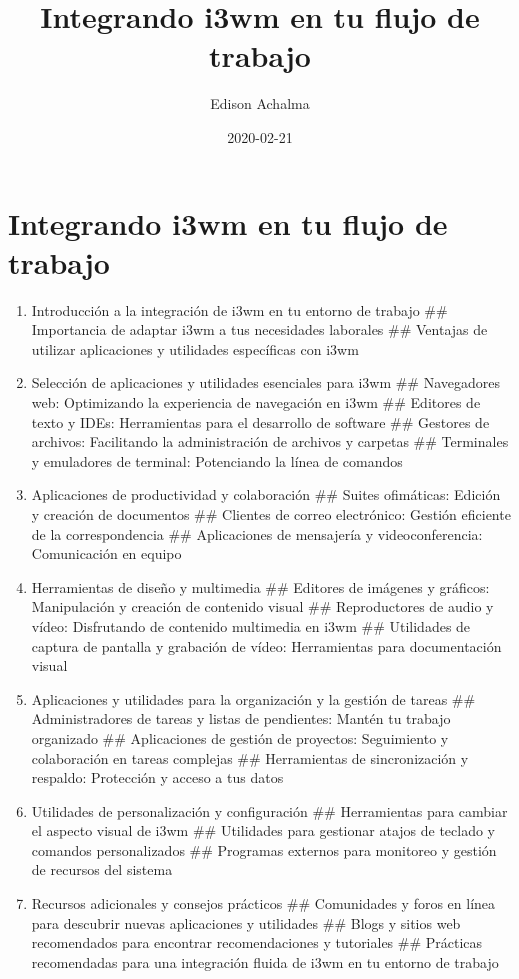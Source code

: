 \documentclass[
  jou,
  floatsintext,
  longtable,
  a4paper,
  nolmodern,
  notxfonts,
  notimes,
  12pt,
  colorlinks=true,linkcolor=blue,citecolor=blue,urlcolor=blue]{apa7}
\title{Integrando i3wm en tu flujo de trabajo}
\author{Edison Achalma}
\affiliation{
{Escuela Profesional de Economía, Universidad Nacional de San Cristóbal
de Huamanga}}
\date{2020-02-21}
\begin{document}
\maketitle


\hypertarget{toc}{}
\tableofcontents
\newpage
\section[Introduction]{Integrando i3wm en tu flujo de trabajo}

\setcounter{secnumdepth}{3}

\setlength\LTleft{0pt}




\begin{enumerate}
\def\labelenumi{\arabic{enumi}.}
\item
  Introducción a la integración de i3wm en tu entorno de trabajo \#\#
  Importancia de adaptar i3wm a tus necesidades laborales \#\# Ventajas
  de utilizar aplicaciones y utilidades específicas con i3wm
\item
  Selección de aplicaciones y utilidades esenciales para i3wm \#\#
  Navegadores web: Optimizando la experiencia de navegación en i3wm \#\#
  Editores de texto y IDEs: Herramientas para el desarrollo de software
  \#\# Gestores de archivos: Facilitando la administración de archivos y
  carpetas \#\# Terminales y emuladores de terminal: Potenciando la
  línea de comandos
\item
  Aplicaciones de productividad y colaboración \#\# Suites ofimáticas:
  Edición y creación de documentos \#\# Clientes de correo electrónico:
  Gestión eficiente de la correspondencia \#\# Aplicaciones de
  mensajería y videoconferencia: Comunicación en equipo
\item
  Herramientas de diseño y multimedia \#\# Editores de imágenes y
  gráficos: Manipulación y creación de contenido visual \#\#
  Reproductores de audio y vídeo: Disfrutando de contenido multimedia en
  i3wm \#\# Utilidades de captura de pantalla y grabación de vídeo:
  Herramientas para documentación visual
\item
  Aplicaciones y utilidades para la organización y la gestión de tareas
  \#\# Administradores de tareas y listas de pendientes: Mantén tu
  trabajo organizado \#\# Aplicaciones de gestión de proyectos:
  Seguimiento y colaboración en tareas complejas \#\# Herramientas de
  sincronización y respaldo: Protección y acceso a tus datos
\item
  Utilidades de personalización y configuración \#\# Herramientas para
  cambiar el aspecto visual de i3wm \#\# Utilidades para gestionar
  atajos de teclado y comandos personalizados \#\# Programas externos
  para monitoreo y gestión de recursos del sistema
\item
  Recursos adicionales y consejos prácticos \#\# Comunidades y foros en
  línea para descubrir nuevas aplicaciones y utilidades \#\# Blogs y
  sitios web recomendados para encontrar recomendaciones y tutoriales
  \#\# Prácticas recomendadas para una integración fluida de i3wm en tu
  entorno de trabajo
\end{enumerate}
\end{document}
